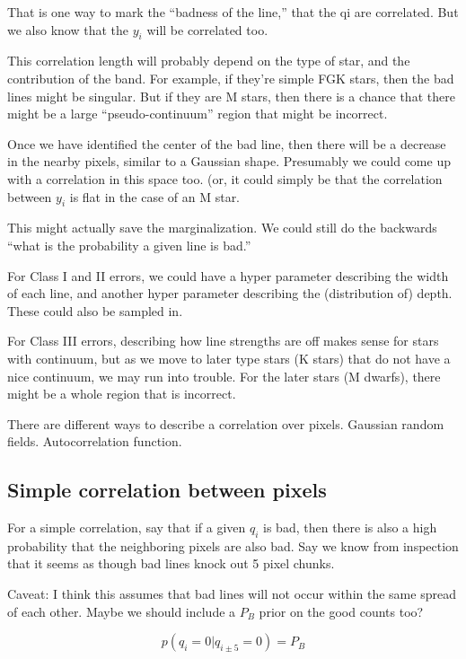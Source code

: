 \documentclass[preprint]{aastex} %
\begin{document}
That is one way to mark the ``badness of the line,'' that the qi are correlated. But we also know that the $y_i$ will be correlated too. 

This correlation length will probably depend on the type of star, and the contribution of the band. For example, if they're simple FGK stars, then the bad lines might be singular. But if they are M stars, then there is a chance that there might be a large ``pseudo-continuum'' region that might be incorrect.

Once we have identified the center of the bad line, then there will be a decrease in the nearby pixels, similar to a Gaussian shape. Presumably we could come up with a correlation in this space too. (or, it could simply be that the correlation between $y_i$ is flat in the case of an M star.

This might actually save the marginalization. We could still do the backwards ``what is the probability a given line is bad.''

For Class I and II errors, we could have a hyper parameter describing the width of each line, and another hyper parameter describing the (distribution of) depth. These could also be sampled in.

For Class III errors, describing how line strengths are off makes sense for stars with continuum, but as we move to later type stars (K stars) that do not have a nice continuum, we may run into trouble. For the later stars (M dwarfs), there might be a whole region that is incorrect.

There are different ways to describe a correlation over pixels. Gaussian random fields. Autocorrelation function.

\subsection{Simple correlation between pixels}
For a simple correlation, say that if a given $q_i$ is bad, then there is also a high probability that the neighboring pixels are also bad. Say we know from inspection that it seems as though bad lines knock out 5 pixel chunks. 


Caveat: I think this assumes that bad lines will not occur within the same spread of each other. Maybe we should include a $P_B$ prior on the good counts too?

\begin{equation}
  p(q_i = 0 | q_{i \pm 5} = 0) = P_B
\end{equation}
\end{document}
